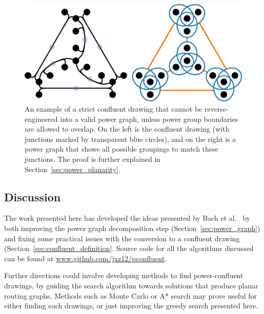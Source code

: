 \begin{figure}
  \centering
  \includegraphics[width=\linewidth]{power/stricter.pdf}
  \caption[A strict confluent drawing that is not power-confluent]{An example of a strict confluent drawing that cannot be reverse-engineered into a valid power graph, unless power group boundaries are allowed to overlap. On the left is the confluent drawing (with junctions marked by transparent blue circles), and on the right is a power graph that shows all possible groupings to match these junctions. The proof is further explained in Section~\ref{sec:power_planarity}.}
  \label{fig:strict}
\end{figure}

\subsection{Discussion}
\label{sec:power_discussion}
The work presented here has developed the ideas presented by Bach et al.\ \cite{Bach2017} by both improving the power graph decomposition step (Section~\ref{sec:power_graph}) and fixing some practical issues with the conversion to a confluent drawing (Section~\ref{sec:confluent_definition}. Source code for all the algorithms discussed can be found at \url{www.github.com/jxz12/pconfluent}.

Further directions could involve developing methods to find power-confluent drawings, by guiding the search algorithm towards solutions that produce planar routing graphs.
Methods such as Monte Carlo or A* search may prove useful for either finding such drawings, or just improving the greedy search presented here.

